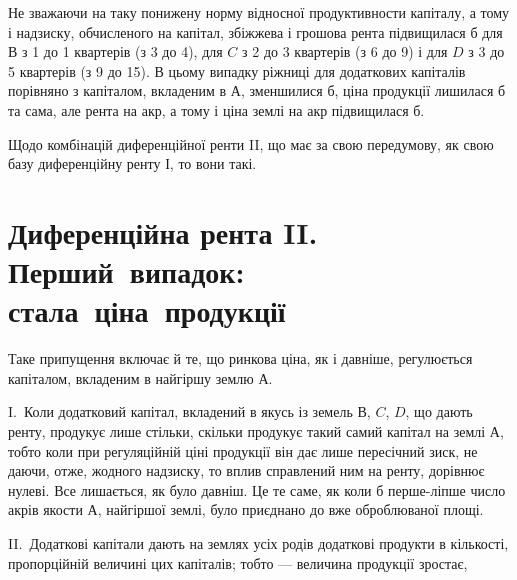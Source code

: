 \noindent{}Не зважаючи на таку понижену норму відносної продуктивности капіталу,
а тому і надзиску, обчисленого на капітал, збіжжева і грошова рента підвищилася
б для $В$ з 1 до 1 квартерів (з 3 до 4), для $C$ з 2 до 3 квартерів (з 6 до 9) і для $D$ з 3 до 5 квартерів (з 9 до 15).
В цьому випадку ріжниці для додаткових капіталів порівняно з капіталом,
вкладеним в $А$, зменшилися б, ціна продукції лишилася б та сама, але рента
на акр, а тому і ціна землі на акр підвищилася б.

Щодо комбінацій диференційної ренти II, що має за свою передумову, як
свою базу диференційну ренту І, то вони такі.

\section{Диференційна рента II. Перший~випадок: стала~ціна~продукції}

Таке припущення включає й те, що ринкова ціна, як і давніше, регулюється
капіталом, вкладеним в найгіршу землю $А$.

I.~Коли додатковий капітал, вкладений в якусь із земель $В$, $C$, $D$, що
дають ренту, продукує лише стільки, скільки продукує такий самий капітал на
землі $А$, тобто коли при регуляційній ціні продукції він дає лише пересічний
зиск, не даючи, отже, жодного надзиску, то вплив справлений ним на ренту, дорівнює
нулеві. Все лишається, як було давніш. Це те саме, як коли б перше-ліпше
число акрів якости $А$, найгіршої землі, було приєднано до вже оброблюваної
площі.

II.~Додаткові капітали дають на землях усіх родів додаткові продукти в кількості,
пропорційній величині цих капіталів; тобто — величина продукції зростає,
\parbreak{}  %
